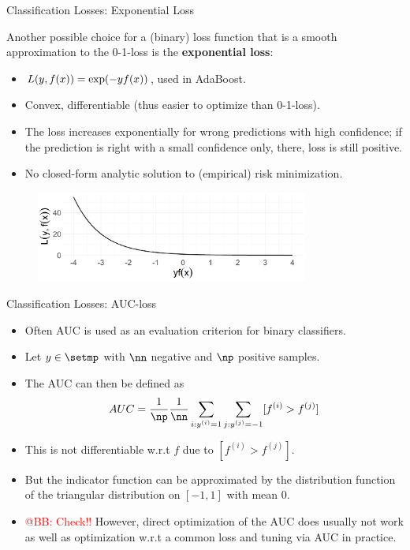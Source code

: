 \begin{vbframe}{Classification Losses: Exponential Loss}

Another possible choice for a (binary) loss function that is a smooth 
approximation to the 0-1-loss is the \textbf{exponential loss}:
\begin{itemize}
\item $L(y, f(x)) = \exp(-yf(x))$, used in AdaBoost.
\item Convex, differentiable (thus easier to optimize than 0-1-loss).
\item The loss increases exponentially for wrong predictions with high confidence; if the prediction is right with a small confidence only, there, loss is still positive.
\item No closed-form analytic solution to (empirical) risk minimization.
\end{itemize}


\begin{figure}
\includegraphics[width = 0.8\textwidth]{figure/plot_loss_exponential.png}
\end{figure}

\end{vbframe}

\begin{vbframe}{Classification Losses: AUC-loss}

\begin{itemize}
\item Often AUC is used as an evaluation criterion for binary classifiers.
\item Let $y \in \setmp$ with $\nn$ negative and $\np$ positive samples. %
\item The AUC can then be defined as
$$AUC = \frac{1}{\np} \frac{1}{\nn} \sum_{i: \yi = 1} \sum_{j: \yi[j] = -1} [f^{(i)} > f^{(j)}]$$
\item This is not differentiable w.r.t $f$ due to $[f^{(i)} > f^{(j)}]$.
\item But the indicator function can be approximated by the distribution function of the triangular distribution on $[-1, 1]$ with mean $0$.
\item \textcolor{red}{@BB: Check!!} However, direct optimization of the AUC does usually not work as well as optimization w.r.t a common loss and tuning via AUC in practice.

\end{itemize}
\end{vbframe}





\endlecture

